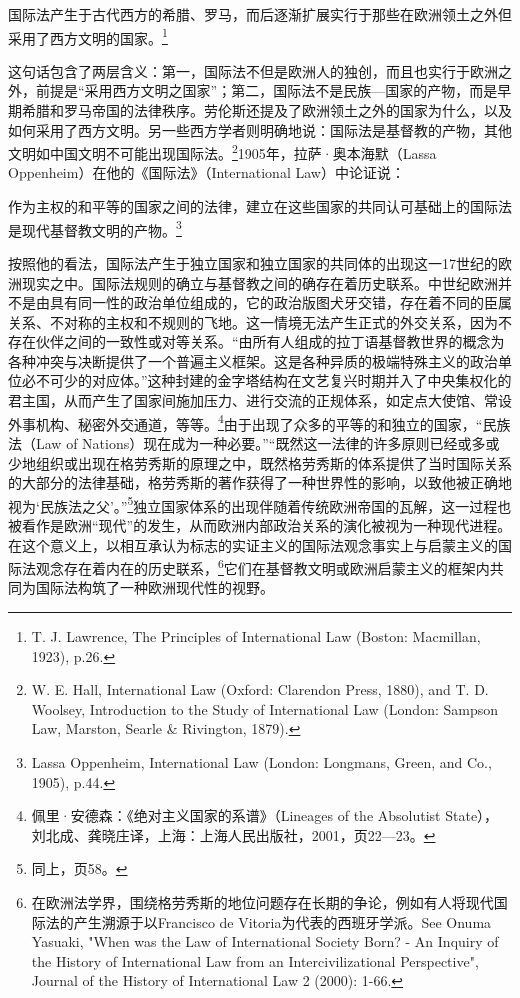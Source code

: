 \documentclass[a4paper, 12pt, openright]{ctexbook}
\renewenvironment{quote}
  {\list{}{\rightmargin2\ccwd \leftmargin2\ccwd \itemindent=2\ccwd \listparindent=2\ccwd}%
   \item\relax\small\kaishu\color{black}}
  {\endlist}
\begin{document}
\begin{quote}
国际法产生于古代西方的希腊、罗马，而后逐渐扩展实行于那些在欧洲领土之外但采用了西方文明的国家。\footnote{T. J. Lawrence, The Principles of International Law (Boston: Macmillan, 1923), p.26.}
\end{quote}

这句话包含了两层含义：第一，国际法不但是欧洲人的独创，而且也实行于欧洲之外，前提是“采用西方文明之国家”；第二，国际法不是民族—国家的产物，而是早期希腊和罗马帝国的法律秩序。劳伦斯还提及了欧洲领土之外的国家为什么，以及如何采用了西方文明。另一些西方学者则明确地说：国际法是基督教的产物，其他文明如中国文明不可能出现国际法。\footnote{W. E. Hall, International Law (Oxford: Clarendon Press, 1880), and T. D. Woolsey, Introduction to the Study of International Law (London: Sampson Law, Marston, Searle \& Rivington, 1879).}1905年，拉萨·奥本海默（Lassa Oppenheim）在他的《国际法》（International Law）中论证说：

\begin{quote}
作为主权的和平等的国家之间的法律，建立在这些国家的共同认可基础上的国际法是现代基督教文明的产物。\footnote{Lassa Oppenheim, International Law (London: Longmans, Green, and Co., 1905), p.44.}
\end{quote}

按照他的看法，国际法产生于独立国家和独立国家的共同体的出现这一17世纪的欧洲现实之中。国际法规则的确立与基督教之间的确存在着历史联系。中世纪欧洲并不是由具有同一性的政治单位组成的，它的政治版图犬牙交错，存在着不同的臣属关系、不对称的主权和不规则的飞地。这一情境无法产生正式的外交关系，因为不存在伙伴之间的一致性或对等关系。“由所有人组成的拉丁语基督教世界的概念为各种冲突与决断提供了一个普遍主义框架。这是各种异质的极端特殊主义的政治单位必不可少的对应体。”这种封建的金字塔结构在文艺复兴时期并入了中央集权化的君主国，从而产生了国家间施加压力、进行交流的正规体系，如定点大使馆、常设外事机构、秘密外交通道，等等。\footnote{佩里·安德森：《绝对主义国家的系谱》（Lineages of the Absolutist State），刘北成、龚晓庄译，上海：上海人民出版社，2001，页22—23。}由于出现了众多的平等的和独立的国家，“民族法（Law of Nations）现在成为一种必要。”“既然这一法律的许多原则已经或多或少地组织或出现在格劳秀斯的原理之中，既然格劳秀斯的体系提供了当时国际关系的大部分的法律基础，格劳秀斯的著作获得了一种世界性的影响，以致他被正确地视为‘民族法之父’。”\footnote{同上，页58。}独立国家体系的出现伴随着传统欧洲帝国的瓦解，这一过程也被看作是欧洲“现代”的发生，从而欧洲内部政治关系的演化被视为一种现代进程。在这个意义上，以相互承认为标志的实证主义的国际法观念事实上与启蒙主义的国际法观念存在着内在的历史联系，\footnote{在欧洲法学界，围绕格劳秀斯的地位问题存在长期的争论，例如有人将现代国际法的产生溯源于以Francisco de Vitoria为代表的西班牙学派。See Onuma Yasuaki, "When was the Law of International Society Born? - An Inquiry of the History of International Law from an Intercivilizational Perspective", Journal of the History of International Law 2 (2000): 1-66.}它们在基督教文明或欧洲启蒙主义的框架内共同为国际法构筑了一种欧洲现代性的视野。
\end{document}
